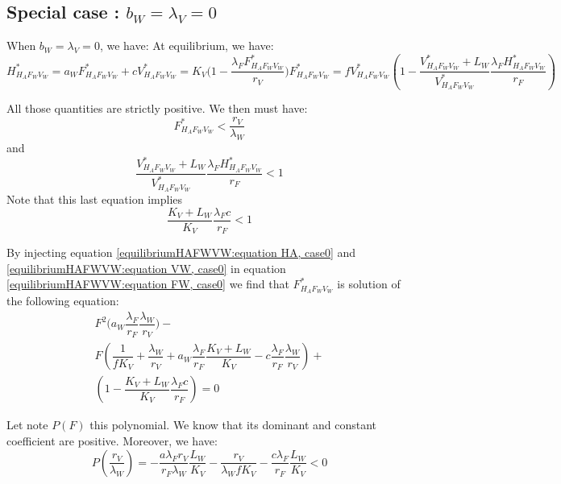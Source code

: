 \documentclass{article}
\newcommand{\lfw}{\lambda_{F}}
\newcommand{\lvw}{\lambda_{V}}
\newcommand{\lfv}{\lambda_{W}}
\begin{document}
\begin{appendices}
\subsection{Special case : $b_W = \lvw = 0$}
When $b_W = \lvw = 0$, we have:
At equilibrium, we have:
\begin{subequations}
\begin{equation}
H^*_{H_AF_WV_W} = a_W F^*_{H_AF_WV_W} + c
\label{equilibriumHAFWVW:equation HA, case0}
\end{equation}
\begin{equation}
V^*_{H_AF_WV_W} = K_V \Big(1 - \dfrac{\lfw F^*_{H_AF_WV_W}}{r_V} \Big)
\label{equilibriumHAFWVW:equation FW, case0}
\end{equation}
\begin{equation}
F^*_{H_AF_WV_W} = f V^*_{H_AF_WV_W} \left(1 - \dfrac{V^*_{H_AF_WV_W} + L_W}{V^*_{H_AF_WV_W} }\dfrac{\lfw H^*_{H_AF_WV_W}}{r_F} \right)
\label{equilibriumHAFWVW:equation VW, case0}
\end{equation}
\end{subequations}

All those quantities are strictly positive. We then must have:
$$
F^*_{H_AF_WV_W} < \dfrac{r_V}{\lfv}
$$
and
$$
\dfrac{V^*_{H_AF_WV_W} + L_W}{V^*_{H_AF_WV_W} }\dfrac{\lfw H^*_{H_AF_WV_W}}{r_F} < 1
$$
Note that this last equation implies 
$$
\dfrac{K_V + L_W}{K_V}\dfrac{\lfw c}{r_F} < 1
$$

By injecting equation \eqref{equilibriumHAFWVW:equation HA, case0} and \eqref{equilibriumHAFWVW:equation VW, case0} in equation \eqref{equilibriumHAFWVW:equation FW, case0}
we find that $F^*_{H_AF_WV_W}$ is solution of the following equation:
\begin{multline}
F^2 \Big(a_W\dfrac{\lfw}{r_F}\dfrac{\lfv}{r_V} \Big) - \\
F \left(\dfrac{1}{fK_V} + \dfrac{\lfv}{r_V} +  a_W \dfrac{\lfw}{r_F}\dfrac{K_V + L_W}{K_V} - c \dfrac{\lfw}{r_F} \dfrac{\lfv}{r_V}\right) + \\
\left(1 - \dfrac{K_V + L_W}{K_V} \dfrac{\lfw c}{r_F} \right) = 0
\label{equilibreHAFWVW:equationFW, case0}
\end{multline}

Let note $P(F)$ this polynomial. We know that its dominant and constant coefficient are positive. Moreover, we have:
\begin{equation*}
P(\dfrac{r_V}{\lfv}) = -\dfrac{a \lfw r_V}{r_F \lfv} \dfrac{L_W}{K_V} - \dfrac{r_V}{\lfv f K_V} - \dfrac{c \lfw}{r_F} \dfrac{L_W}{K_V} < 0
\end{equation*}


\end{appendices}
\end{document}
